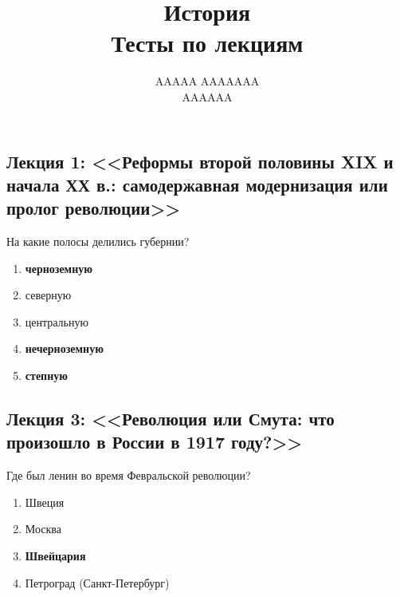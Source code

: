\documentclass[12pt]{article}
\title{История \\ Тесты по лекциям}
\author{AAAAA AAAAAAA \\ AAAAAA}
\begin{document}
  \maketitle

  \subsection*{Лекция 1: <<Реформы второй половины XIX и начала ХХ в.: самодержавная модернизация или пролог революции>>}
  На какие полосы делились губернии?
  \begin{enumerate}
    \item \textbf{черноземную}
    \item северную
    \item центральную
    \item \textbf{нечерноземную}
    \item \textbf{степную}
  \end{enumerate}

  \subsection*{Лекция 3: <<Революция или Смута: что произошло в России в 1917 году?>>}
  Где был ленин во время Февральской революции?
  \begin{enumerate}
    \item Швеция
    \item Москва
    \item \textbf{Швейцария}
    \item Петроград (Санкт-Петербург)
  \end{enumerate}
\end{document}
